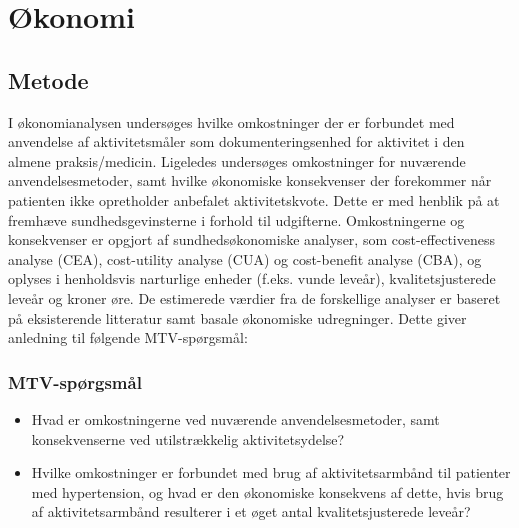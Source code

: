 \chapter{Økonomi}

\section{Metode}
I økonomianalysen undersøges hvilke omkostninger der er forbundet med anvendelse af aktivitetsmåler som dokumenteringsenhed for aktivitet i den almene praksis/medicin.
Ligeledes undersøges omkostninger for nuværende anvendelsesmetoder, samt hvilke økonomiske konsekvenser der forekommer når patienten ikke opretholder anbefalet aktivitetskvote.
Dette er med henblik på at fremhæve sundhedsgevinsterne i forhold til udgifterne.   
Omkostningerne og konsekvenser er opgjort af sundhedsøkonomiske analyser, som cost-effectiveness analyse (CEA), cost-utility analyse (CUA) og cost-benefit analyse (CBA), og oplyses i henholdsvis narturlige enheder (f.eks. vunde leveår), kvalitetsjusterede leveår og kroner øre. 
De estimerede værdier fra de forskellige analyser er baseret på eksisterende litteratur samt basale økonomiske udregninger.
Dette giver anledning til følgende MTV-spørgsmål: 

\subsection{MTV-spørgsmål}
 
\begin{itemize}
\item Hvad er omkostningerne ved nuværende anvendelsesmetoder, samt konsekvenserne ved utilstrækkelig aktivitetsydelse? 

\item Hvilke omkostninger er forbundet med brug af aktivitetsarmbånd til patienter med hypertension, og hvad er den økonomiske konsekvens af dette, hvis brug af aktivitetsarmbånd resulterer i et øget antal kvalitetsjusterede leveår?


\end{itemize}
 




